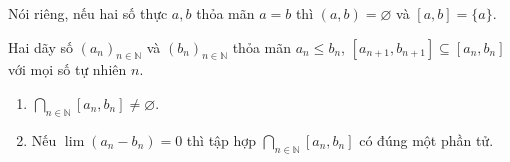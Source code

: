 Nói riêng, nếu hai số thực $a, b$ thỏa mãn $a = b$ thì $(a, b) = \varnothing$ và $[a, b] = \{ a \}$.

\begin{theorem}
    Hai dãy số ${(a_{n})}_{n\in\mathbb{N}}$ và ${(b_{n})}_{n\in\mathbb{N}}$ thỏa mãn $a_{n}\leq b_{n}$, $[a_{n+1}, b_{n+1}]\subseteq [a_{n}, b_{n}]$ với mọi số tự nhiên $n$.
    \begin{enumerate}[label={(\roman*)}]
        \item $\bigcap_{n\in\mathbb{N}} [a_{n}, b_{n}]\ne \varnothing$.
        \item Nếu $\lim (a_{n} - b_{n}) = 0$ thì tập hợp $\bigcap_{n\in\mathbb{N}} [a_{n}, b_{n}]$ có đúng một phần tử.
    \end{enumerate}
\end{theorem}


